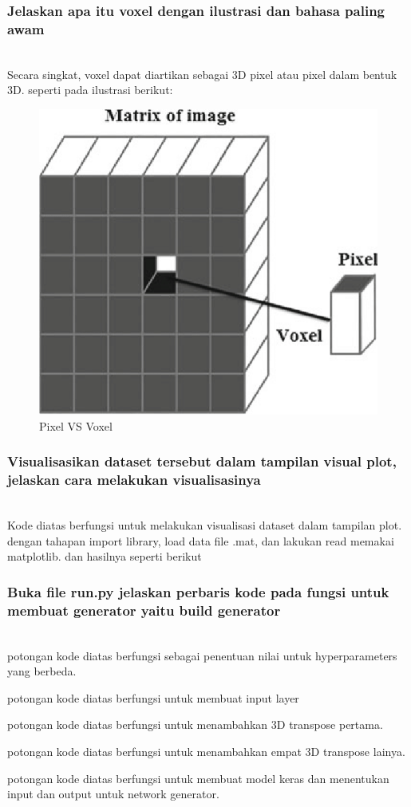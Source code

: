 \subsubsection{Jelaskan apa itu voxel dengan ilustrasi dan bahasa paling awam}
\hfill\\
Secara singkat, voxel dapat diartikan sebagai 3D pixel atau pixel dalam bentuk 3D. seperti pada ilustrasi berikut:
\begin{figure}[H]
	\centering
	\includegraphics[width=12cm]{figures/1174079/8/voxel.png}
	\caption{Pixel VS Voxel}
\end{figure}


\subsubsection{Visualisasikan dataset tersebut dalam tampilan visual plot, jelaskan cara melakukan visualisasinya}
\hfill\\

Kode diatas berfungsi untuk melakukan visualisasi dataset dalam tampilan plot. dengan tahapan import library, load data file .mat, dan lakukan read memakai matplotlib. dan hasilnya seperti berikut


\subsubsection{Buka file run.py jelaskan perbaris kode pada fungsi untuk membuat generator yaitu build generator}
\hfill\\

potongan kode diatas berfungsi sebagai penentuan nilai untuk hyperparameters yang berbeda.

potongan kode diatas berfungsi untuk membuat input layer

potongan kode diatas berfungsi untuk menambahkan 3D transpose pertama.

potongan kode diatas berfungsi untuk menambahkan empat 3D transpose lainya.

potongan kode diatas berfungsi untuk membuat model keras dan menentukan input dan output untuk network generator.

